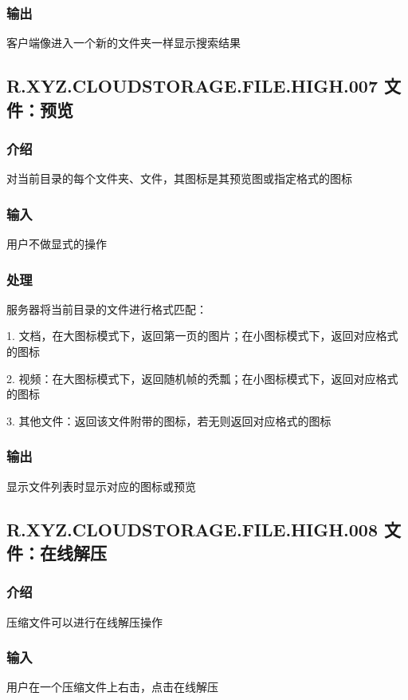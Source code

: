 \subsubsection{输出} 
客户端像进入一个新的文件夹一样显示搜索结果

\subsection{R.XYZ.CLOUDSTORAGE.FILE.HIGH.007 文件：预览}

\subsubsection{介绍}
对当前目录的每个文件夹、文件，其图标是其预览图或指定格式的图标

\subsubsection{输入} 
用户不做显式的操作

\subsubsection{处理} 
服务器将当前目录的文件进行格式匹配：

1. 文档，在大图标模式下，返回第一页的图片；在小图标模式下，返回对应格式的图标

2. 视频：在大图标模式下，返回随机帧的秃瓢；在小图标模式下，返回对应格式的图标

3. 其他文件：返回该文件附带的图标，若无则返回对应格式的图标

\subsubsection{输出} 
显示文件列表时显示对应的图标或预览


\subsection{R.XYZ.CLOUDSTORAGE.FILE.HIGH.008 文件：在线解压}

\subsubsection{介绍}
压缩文件可以进行在线解压操作

\subsubsection{输入} 
用户在一个压缩文件上右击，点击在线解压

